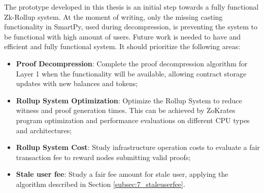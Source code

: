The prototype developed in this thesis is an initial step towards a fully functional Zk-Rollup system. At the moment of writing, only the missing casting functionality in SmartPy, used during decompression, is preventing the system to be functional with high amount of users. Future work is needed to have and efficient and fully functional system. It should prioritize the following areas:
\vspace{-0.11in}
\begin{itemize}
	\item \textbf{Proof Decompression}: Complete the proof decompression algorithm for Layer 1 when the functionality will be available, allowing contract storage updates with new balances and tokens;
	      \vspace{-0.11in}
	\item \textbf{Rollup System Optimization}: Optimize the Rollup System to reduce witness and proof generation times. This can be achieved by ZoKrates program optimization and performance evaluations on different CPU types and architectures;
	      \vspace{-0.11in}
	\item \textbf{Rollup System Cost}: Study infrastructure operation costs to evaluate a fair transaction fee to reward nodes submitting valid proofs;
	      \vspace{-0.11in}
	\item \textbf{Stale user fee}: Study a fair fee amount for stale user, applying the algorithm described in Section \ref{subsec:7_staleuserfee}.
	\vspace{-0.11in}
\end{itemize}




